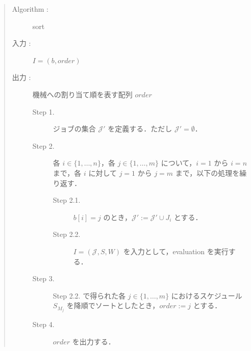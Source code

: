 \documentclass[12pt]{optlab-bachelor}
\begin{document}
\begin{quote}
  \begin{description}
    \item[{\sc Algorithm : }] {\sc sort}
    \item[入力 :] $I = (b, order)$
    \item[出力 :] 機械への割り当て順を表す配列 $order$
    \begin{description}
      \item[Step 1.] ジョブの集合 $\mathcal{J}'$ を定義する．ただし $\mathcal{J}' = \emptyset$．
      \item[Step 2.] 各 $i \in \{1,\ldots,n\}$，各 $j \in \{1,\ldots,m\}$ について，$i = 1$ から $i = n$ まで，各 $i$ に対して $j = 1$ から $j = m$ まで，以下の処理を繰り返す．
      \begin{description}
        \item[Step 2.1.] $b[i] = j$ のとき，$\mathcal{J}' :=\mathcal{J}' \cup J_i$ とする．
        \item[Step 2.2.] $I = (\mathcal{J},S,W)$ を入力として，{\sc evaluation} を実行する．
      \end{description}
      \item[Step 3.] Step 2.2. で得られた各 $j \in \{1,\ldots,m\}$ におけるスケジュール $S_{M_j}$ を降順でソートとしたとき，$order := j$ とする．
      \item[Step 4.] $order$ を出力する．
    \end{description}
  \end{description}
\end{quote}
\end{document}
